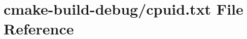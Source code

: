 \hypertarget{cpuid_8txt}{}\section{cmake-\/build-\/debug/cpuid.txt File Reference}
\label{cpuid_8txt}
